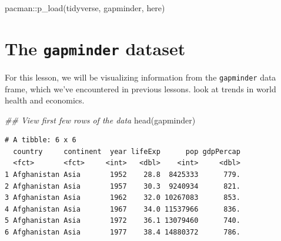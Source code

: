 \documentclass[
  letterpaper,
  DIV=11,
  numbers=noendperiod]{scrreprt}
\newenvironment{Shaded}{\begin{snugshade}}{\end{snugshade}}
\newcommand{\DocumentationTok}[1]{\textcolor[rgb]{0.37,0.37,0.37}{\textit{#1}}}
\newcommand{\FunctionTok}[1]{\textcolor[rgb]{0.28,0.35,0.67}{#1}}
\newcommand{\NormalTok}[1]{\textcolor[rgb]{0.00,0.23,0.31}{#1}}
\newcommand{\SpecialCharTok}[1]{\textcolor[rgb]{0.37,0.37,0.37}{#1}}
\begin{document}
\begin{Shaded}
\begin{Highlighting}[]
\NormalTok{pacman}\SpecialCharTok{::}\FunctionTok{p\_load}\NormalTok{(tidyverse,}
\NormalTok{               gapminder,}
\NormalTok{               here)}
\end{Highlighting}
\end{Shaded}

\hypertarget{the-gapminder-dataset}{%
\section{\texorpdfstring{The \texttt{gapminder}
dataset}{The gapminder dataset}}\label{the-gapminder-dataset}}

For this lesson, we will be visualizing information from the
\texttt{gapminder} data frame, which we've encountered in previous
lessons. look at trends in world health and economics.

\begin{Shaded}
\begin{Highlighting}[]
\DocumentationTok{\#\# View first few rows of the data}
\FunctionTok{head}\NormalTok{(gapminder)}
\end{Highlighting}
\end{Shaded}

\begin{verbatim}
# A tibble: 6 x 6
  country     continent  year lifeExp      pop gdpPercap
  <fct>       <fct>     <int>   <dbl>    <int>     <dbl>
1 Afghanistan Asia       1952    28.8  8425333      779.
2 Afghanistan Asia       1957    30.3  9240934      821.
3 Afghanistan Asia       1962    32.0 10267083      853.
4 Afghanistan Asia       1967    34.0 11537966      836.
5 Afghanistan Asia       1972    36.1 13079460      740.
6 Afghanistan Asia       1977    38.4 14880372      786.
\end{verbatim}
\end{document}
